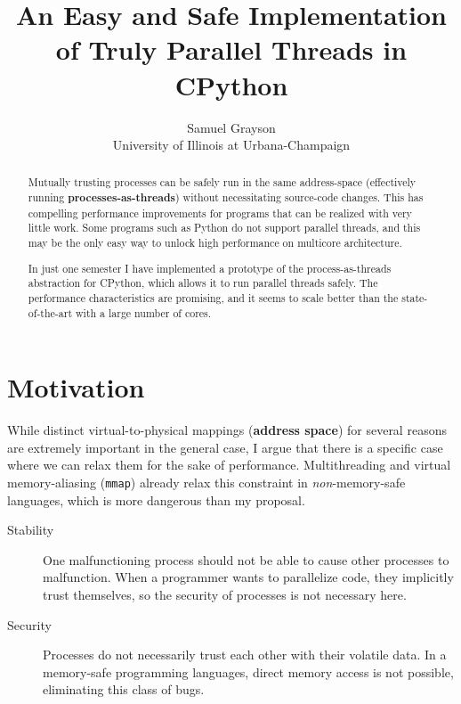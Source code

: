 \documentclass[letterpaper,twocolumn,10pt]{article}
\newcommand{\citeme}{}
\begin{document}

\title{\Large \bf An Easy and Safe Implementation of Truly Parallel Threads in CPython}

\author{
{\rm Samuel Grayson}\\
University of Illinois at Urbana-Champaign
}

\maketitle

\begin{abstract}

  Mutually trusting processes can be safely run in the same address-space (effectively running \textbf{processes-as-threads}) without necessitating source-code changes.
  This has compelling performance improvements for programs that can be realized with very little work.
  Some programs such as Python do not support parallel threads, and this may be the only easy way to unlock high performance on multicore architecture.

  In just one semester I have implemented a prototype of the process-as-threads abstraction for CPython, which allows it to run parallel threads safely.
  The performance characteristics are promising, and it seems to scale better than the state-of-the-art with a large number of cores.
\end{abstract}

\section{Motivation}

While distinct virtual-to-physical mappings (\textbf{address space}) for several reasons are extremely important in the general case, 
I argue that there is a specific case where we can relax them for the sake of performance.
Multithreading and virtual memory-aliasing (\texttt{mmap}) already relax this constraint in \textit{non}-memory-safe languages, which is more dangerous than my proposal.

\begin{description}
\item[Stability]
  One malfunctioning process should not be able to cause other processes to malfunction\citeme.
  When a programmer wants to parallelize code, they implicitly trust themselves, so the security of processes is not necessary here\citeme.
\item[Security]
  Processes do not necessarily trust each other with their volatile data\citeme.
  In a memory-safe programming languages, direct memory access is not possible, eliminating this class of bugs\citeme.
\end{description}
\end{document}
